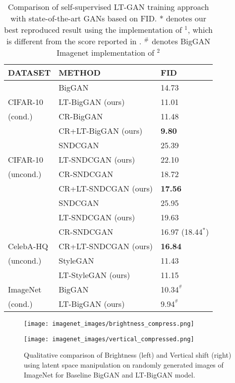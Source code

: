 \documentclass[10pt,twocolumn,letterpaper]{article}
\begin{document}
\begin{table}[t]
\begin{tabular}{lll}
\hline
DATASET   & METHOD               & FID    \\ \hline
          & BigGAN       & 14.73  \\
CIFAR-10  & LT-BigGAN (ours)    & 11.01    \\
(cond.)   & CR-BigGAN     & 11.48   \\
          & CR+LT-BigGAN (ours) & \textbf{9.80}   \\ \hline
          & SNDCGAN        & 25.39  \\
CIFAR-10  & LT-SNDCGAN (ours)    & 22.10   \\
(uncond.) & CR-SNDCGAN   & 18.72  \\
          & CR+LT-SNDCGAN (ours) & \textbf{17.56}   \\ \hline
          & SNDCGAN              & 25.95  \\
          & LT-SNDCGAN  (ours)         & 19.63  \\
          & CR-SNDCGAN          & 16.97 (18.44$^{*}$) \\
CelebA-HQ & CR+LT-SNDCGAN (ours)      & \textbf{16.84}  \\ \cline{2-3}
(uncond.)          & StyleGAN             & 11.43  \\
          & LT-StyleGAN (ours)         & 11.15  \\ \hline
ImageNet  & BigGAN        & 10.34$^{^{\#}}$ \\
(cond.)   & LT-BigGAN (ours)    & 9.94$^{^{\#}}$  \\ \hline
\end{tabular}
\caption{\footnotesize{Comparison of self-supervised LT-GAN training approach with state-of-the-art GANs based on FID. * denotes our best reproduced result using the implementation of $^{1}$, which is different from the score reported in \cite{crgan2019chen}. $^{\#}$ denotes BigGAN Imagenet implementation of $^{2}$}}
\label{tab:sota-table}
\end{table}


\begin{figure*}[t]
\centering
    \begin{minipage}{.45\textwidth}
      \texttt{[image: imagenet\_images/brightness\_compress.png]}
    \end{minipage}\hspace{0.5cm}
    \begin{minipage}{.45\textwidth}
      \texttt{[image: imagenet\_images/vertical\_compressed.png]}
    \end{minipage}
    \caption{\footnotesize{Qualitative comparison of Brightness (left) and Vertical shift (right) using latent space manipulation on randomly generated images of ImageNet for Baseline BigGAN and LT-BigGAN model.}}
    \label{fig:brightness}
\end{figure*}
\end{document}
